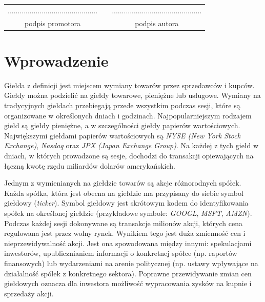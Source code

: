 \documentclass[a4paper, twoside, 11pt, openright]{article}
\newcommand{\fncymain}{%
	\fancyhead[RO]{{\footnotesize \rightmark}}
	\fancyfoot[RO]{\thepage}
	\fancyhead[LE]{{\footnotesize \leftmark}}
	\fancyfoot[LE]{\thepage}
	\fancyfoot[C]{}
	\renewcommand{\headrulewidth}{0.3pt}}
\begin{document}
\cleardoublepage


\hfill
\begin{table}[b]
\centering
\begin{tabular}[t]{ccc}
............................................. & \hspace*{100pt} & .............................................\\
podpis promotora & \hspace*{100pt} & podpis autora
\end{tabular}
\end{table}

\fncymain



\cleardoublepage

\tableofcontents

\cleardoublepage

\section{Wprowadzenie}

Giełda z definicji jest miejscem wymiany towarów przez sprzedawców i kupców. Giełdy można podzielić na giełdy towarowe, pieniężne lub usługowe. Wymiany na tradycyjnych giełdach przebiegają przede wszystkim podczas sesji, które są organizowane w określonych dniach i godzinach. Najpopularniejszym rodzajem giełd są giełdy pieniężne, a w szczególności giełdy papierów wartościowych. Największymi giełdami papierów wartościowych są \textit{NYSE (New York Stock Exchange)}\cite{nyse}, \textit{Nasdaq}\cite{nasdaq} oraz \textit{JPX (Japan Exchange Group)}\cite{jpx}. Na każdej z tych giełd w dniach, w których prowadzone są sesje, dochodzi do transakcji opiewających na łączną kwotę rzędu miliardów dolarów amerykańskich.

\bigskip

 Jednym z wymienianych na giełdzie towarów są akcje różnorodnych spółek. Każda spółka, która jest obecna na giełdzie ma przypisany do siebie symbol giełdowy (\textit{ticker}). Symbol giełdowy jest skrótowym kodem do identyfikowania spółek na określonej giełdzie (przykładowe symbole: \textit{GOOGL}, \textit{MSFT}, \textit{AMZN}). Podczas każdej sesji dokonywane są transakcje milionów akcji, których cena regulowana jest przez wolny rynek. Wynikiem tego jest duża zmienność cen i nieprzewidywalność akcji. Jest ona spowodowana między innymi: spekulacjami inwestorów, upublicznianiem informacji o konkretnej spółce (np. raportów finansowych) lub wydarzeniami na arenie politycznej (np. ustawy wpływające na działalność spólek z konkretnego sektora). Poprawne przewidywanie zmian cen giełdowych oznacza dla inwestora możliwość wypracowania zysków na kupnie i sprzedaży akcji.
 
\end{document}
